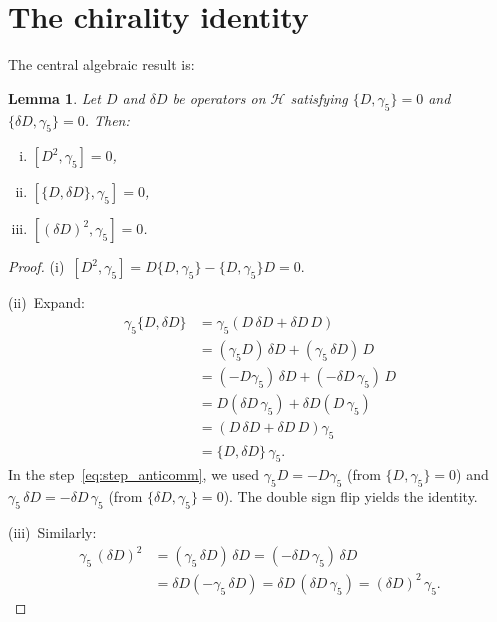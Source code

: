 \documentclass[12pt,a4paper]{article}
\newtheorem{lemma}[theorem]{Lemma}
\theoremstyle{definition}
\theoremstyle{remark}
\newcommand{\Hilb}{\mathcal{H}}
\begin{document}
\section{The chirality identity}
\label{sec:chirality_identity}

The central algebraic result is:

\begin{lemma}\label{lem:anticommute}
Let $D$ and $\delta D$ be operators on $\Hilb$ satisfying
$\{D, \gamma_5\} = 0$ and $\{\delta D, \gamma_5\} = 0$.  Then:
\begin{enumerate}[(i)]
  \item $[D^2, \gamma_5] = 0$,
  \item $[\{D, \delta D\}, \gamma_5] = 0$,
  \item $[(\delta D)^2, \gamma_5] = 0$.
\end{enumerate}
\end{lemma}

\begin{proof}
(i)~$[D^2, \gamma_5] = D\{D, \gamma_5\} - \{D, \gamma_5\}D = 0$.

\medskip\noindent
(ii)~Expand:
\begin{align}
  \gamma_5 \{D, \delta D\}
  &= \gamma_5(D\,\delta D + \delta D\, D) \nonumber \\
  &= (\gamma_5 D)\,\delta D + (\gamma_5\,\delta D)\,D \nonumber \\
  &= (-D\gamma_5)\,\delta D + (-\delta D\,\gamma_5)\, D
    \label{eq:step_anticomm}\\
  &= D(\delta D\,\gamma_5) + \delta D(D\,\gamma_5)  \nonumber \\
  &= (D\,\delta D + \delta D\, D)\gamma_5 \nonumber \\
  &= \{D, \delta D\}\,\gamma_5. \nonumber
\end{align}
In the step~\eqref{eq:step_anticomm}, we used $\gamma_5 D = -D\gamma_5$
(from $\{D, \gamma_5\} = 0$) and $\gamma_5\,\delta D = -\delta D\,\gamma_5$
(from $\{\delta D, \gamma_5\} = 0$).  The double sign flip yields the identity.

\medskip\noindent
(iii)~Similarly:
\begin{align}
  \gamma_5\,(\delta D)^2
  &= (\gamma_5\,\delta D)\,\delta D
  = (-\delta D\,\gamma_5)\,\delta D \nonumber \\
  &= \delta D(-\gamma_5\,\delta D)
  = \delta D\,(\delta D\,\gamma_5)
  = (\delta D)^2\,\gamma_5. \nonumber
\end{align}
\end{proof}
\end{document}
